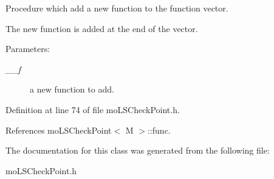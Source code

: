 Procedure which add a new function to the function vector. 

The new function is added at the end of the vector. \begin{Desc}
\item[Parameters:]
\begin{description}
\item[{\em \_\-\_\-f}]a new function to add. \end{description}
\end{Desc}


Definition at line 74 of file moLSCheckPoint.h.

References moLSCheckPoint$<$ M $>$::func.

The documentation for this class was generated from the following file:\begin{CompactItemize}
\item 
moLSCheckPoint.h\end{CompactItemize}
